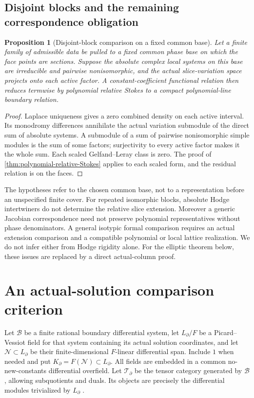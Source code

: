 \documentclass[11pt]{article}
\numberwithin{equation}{section}
\newtheorem{proposition}[proposition]{Proposition}
\theoremstyle{definition}
\theoremstyle{remark}
\newcommand{\Ncal}{\mathcal N}
\newcommand{\Tcal}{\mathcal T}
\begin{document}
\subsection{Disjoint blocks and the remaining correspondence obligation}
\begin{proposition}[Disjoint-block comparison on a fixed common base]
\label{prop:audited-disjoint}
Let a finite family of admissible data be pulled to a fixed common phase
base on which the face points are sections. Suppose the absolute complex
local systems on this base are irreducible and pairwise nonisomorphic,
and the actual slice-variation space projects onto each active factor.
A constant-coefficient functional relation then reduces termwise by
polynomial relative Stokes to a compact polynomial-line boundary relation.
\end{proposition}
\begin{proof}
Laplace uniqueness gives a zero combined density on each active interval.
Its monodromy differences annihilate the actual variation submodule of
the direct sum of absolute systems. A submodule of a sum of pairwise
nonisomorphic simple modules is the sum of some factors; surjectivity to
every active factor makes it the whole sum. Each scaled Gelfand--Leray
class is zero. The proof of \cref{thm:polynomial-relative-Stokes} applies
to each scaled form, and the residual relation is on the faces.
\end{proof}

The hypotheses refer to the chosen common base, not to a representation
before an unspecified finite cover. For repeated isomorphic blocks,
absolute Hodge intertwiners do not determine the relative slice extension.
Moreover a generic Jacobian correspondence need not preserve polynomial
representatives without phase denominators. A general isotypic formal
comparison requires an actual extension comparison and a compatible
polynomial or local lattice realization. We do not infer either from
Hodge rigidity alone. For the elliptic theorem below, these issues are
replaced by a direct actual-column proof.
\section{An actual-solution comparison criterion}
Let $\mathcal B$ be a finite rational boundary differential system, let
$L_\partial/F$ be a Picard--Vessiot field for that system containing its
actual solution coordinates, and let $\Ncal\subset L_\partial$ be their
finite-dimensional $F$-linear differential span. Include $1$ when needed and put $K_\partial=F(\Ncal)\subset L_\partial$. All fields are embedded in a common no-new-constants differential overfield.
Let $\Tcal_\partial$ be the tensor category generated by $\mathcal B$,
allowing subquotients and duals. Its objects are precisely the differential
modules trivialized by $L_\partial$ \cite[Theorem 1.5.2]{Singer}.
\end{document}
